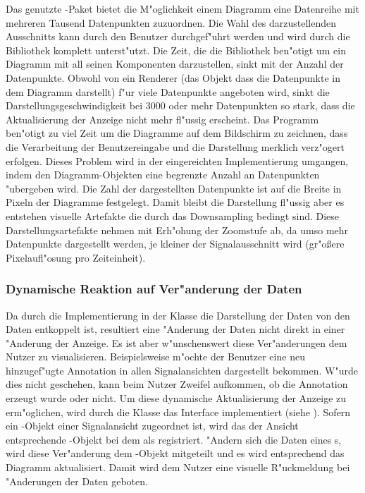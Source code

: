 Das genutzte \jfcNS-Paket bietet die M"oglichkeit einem Diagramm eine Datenreihe mit mehreren Tausend Datenpunkten zuzuordnen.
Die Wahl des darzustellenden Ausschnitts kann durch den Benutzer durchgef"uhrt werden und wird durch die Bibliothek komplett unterst"utzt.
Die Zeit, die die Bibliothek ben"otigt um ein Diagramm mit all seinen Komponenten darzustellen, sinkt mit der Anzahl der Datenpunkte.
Obwohl von \jfc ein Renderer (das Objekt dass die Datenpunkte in dem Diagramm darstellt) f"ur viele Datenpunkte angeboten wird, sinkt die Darstellungsgeschwindigkeit bei \unit{3000} oder mehr Datenpunkten so stark, dass die Aktualisierung der Anzeige nicht mehr fl"ussig erscheint.
Das Programm ben"otigt zu viel Zeit um die Diagramme auf dem Bildschirm zu zeichnen, dass die Verarbeitung der Benutzereingabe und die Darstellung merklich verz"ogert erfolgen.
Dieses Problem wird in der eingereichten Implementierung umgangen, indem den Diagramm-Objekten eine begrenzte Anzahl an Datenpunkten "ubergeben wird.
Die Zahl der dargestellten Datenpunkte ist auf die Breite in Pixeln der Diagramme festgelegt.
Damit bleibt die Darstellung fl"ussig aber es entstehen visuelle Artefakte die durch das Downsampling bedingt sind.
Diese Darstellungsartefakte nehmen mit Erh"ohung der Zoomstufe ab, da umso mehr Datenpunkte dargestellt werden, je kleiner der Signalausschnitt wird (gr"o{\ss}ere Pixelaufl"osung pro Zeiteinheit).


\subsubsection{Dynamische Reaktion auf Ver"anderung der Daten}

Da durch die Implementierung in der Klasse  die Darstellung der Daten von den Daten entkoppelt ist, resultiert eine "Anderung der Daten nicht direkt in einer "Anderung der Anzeige.
Es ist aber w"unschenswert diese Ver"anderungen dem Nutzer zu visualisieren.
Beispielsweise m"ochte der Benutzer eine neu hinzugef"ugte Annotation in allen Signalansichten dargestellt bekommen.
W"urde dies nicht geschehen, kann beim Nutzer Zweifel aufkommen, ob die Annotation erzeugt wurde oder nicht.
Um diese dynamische Aktualisierung der Anzeige zu erm"oglichen, wird durch die Klasse  das Interface  implementiert (siehe ).
Sofern ein -Objekt einer Signalansicht zugeordnet ist, wird das der Ansicht entsprechende -Objekt bei dem  als  registriert.
"Andern sich die Daten eines s, wird diese Ver"anderung dem -Objekt mitgeteilt und es wird entsprechend das Diagramm aktualisiert.
Damit wird dem Nutzer eine visuelle R"uckmeldung bei "Anderungen der Daten geboten.

